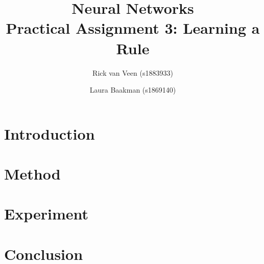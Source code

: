 \documentclass[twoside, a4paper, twocolumn]{article}
\title{Neural Networks\\Practical Assignment 3: Learning a Rule}
\author{Rick van Veen (s1883933) \and Laura Baakman (s1869140)}
\begin{document}





\section{Introduction}

	
\section{Method}
\label{s:method}
	

\section{Experiment}
	

\section{Conclusion}


\printbibliography

\end{document}
